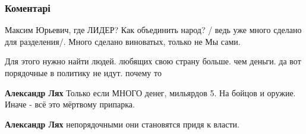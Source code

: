  
 
 
 
 
\subsubsection{Коментарі}
\label{sec:25_08_2021.fb.goldarb_maksim.1.chto_delat_otvet.cmt}

\begin{itemize}
 
Максим Юрьевич, где ЛИДЕР?
Как объединить народ? / ведь уже много сделано для разделения/.
Много сделано виноватых, только не Мы сами.

 
Для этого нужно найти людей. любящих свою страну больше. чем деньги. да вот порядочные в политику не идут. почему то

\begin{itemize}

 
\textbf{Александр Лях} Только если МНОГО денег, мильярдов 5. На бойцов и оружие. Иначе - всё это мёртвому припарка.

 
\textbf{Александр Лях} непорядочными они становятся придя к власти.

 

\end{itemize}
\end{itemize}
